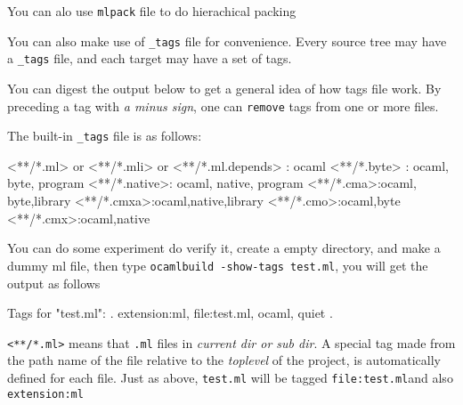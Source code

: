 You can alo use  \verb|mlpack| file to do hierachical packing 

You can also make use of \verb|_tags| file for convenience.  Every
source tree may have a \verb|_tags| file, and each target may have a
set of tags.


You can digest the output below to get a general idea of how tags file
work.  By preceding a tag with \textit{a minus sign}, one can
\verb|remove| tags from one or more files.


The built-in \verb|_tags| file is as follows:

\begin{bashcode}
<**/*.ml>   or <**/*.mli> or <**/*.ml.depends> : ocaml 
<**/*.byte> : ocaml, byte, program 
<**/*.native>: ocaml, native, program
<**/*.cma>:ocaml, byte,library
<**/*.cmxa>:ocaml,native,library
<**/*.cmo>:ocaml,byte
<**/*.cmx>:ocaml,native
\end{bashcode}

You can do some experiment do verify it, create a empty directory, and
make a dummy ml file, then type \verb|ocamlbuild -show-tags test.ml|,
you will get the output as follows 

\begin{bashcode}
Tags for "test.ml": {. extension:ml, file:test.ml, ocaml, quiet .}
\end{bashcode}

\verb|<**/*.ml>| means that \verb|.ml| files in \emph{current dir or
  sub dir}. A special tag made from the path name of the file relative
to the \textit{toplevel} of the project, is automatically defined for each
file.  Just as above, \verb|test.ml| will be tagged
\verb|file:test.ml|and also \verb|extension:ml|

